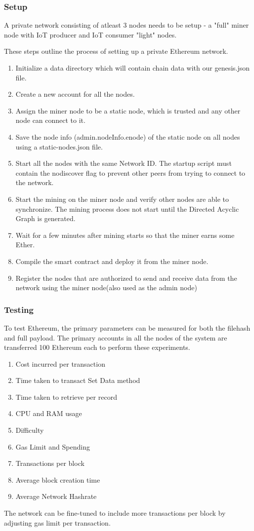 \documentclass[11pt,openright]{report}
\begin{document}
\subsubsection{Setup}
A private network consisting of atleast 3 nodes needs to be setup - a "full" miner node with IoT producer and IoT consumer "light" nodes.

These steps outline the process of setting up a private Ethereum network.
\begin{enumerate}
    \item Initialize a data directory which will contain chain data with our genesis.json file.
    \item Create a new account for all the nodes.
    \item Assign the miner node to be a static node, which is trusted and any other node can connect to it. 
    \item Save the node info (admin.nodeInfo.enode) of the static node on all nodes using a static-nodes.json file.
    \item Start all the nodes with the same Network ID. The startup script must contain the nodiscover flag to prevent other peers from trying to connect to the network.
    \item Start the mining on the miner node and verify other nodes are able to synchronize. The mining process does not start until the Directed Acyclic Graph is generated. 
    \item Wait for a few minutes after mining starts so that the miner earns some Ether. 
    \item Compile the smart contract and deploy it from the miner node.
    \item Register the nodes that are authorized to send and receive data from the network using the miner node(also used as the admin node)
\end{enumerate}


\subsubsection{Testing}
To test Ethereum, the primary parameters can be measured for both the filehash and full payload. The primary accounts in all the nodes of the system are transferred 100 Ethereum each to perform these experiments. 
\begin{enumerate}
    \item Cost incurred per transaction
    \item Time taken to transact Set Data method
    \item Time taken to retrieve per record
    \item CPU and RAM usage
    \item Difficulty
    \item Gas Limit and Spending
    \item Transactions per block
    \item Average block creation time
    \item Average Network Hashrate
\end{enumerate}
The network can be fine-tuned to include more transactions per block by adjusting gas limit per transaction.
\end{document}
